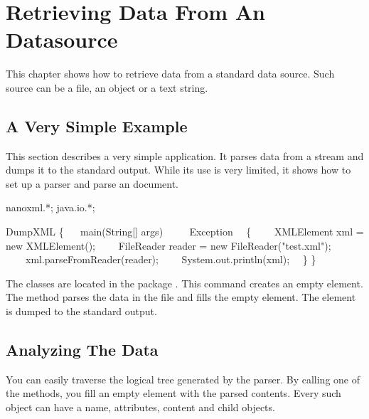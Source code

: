 \chapter{Retrieving Data From An  Datasource}

This chapter shows how to retrieve  data from a standard data source.
Such source can be a file, an  object or a text string.

\section{A Very Simple Example}

This section describes a very simple  application.
It parses  data from a stream and dumps it to the standard output.
While its use is very limited, it shows how to set up a parser and parse an
 document.

\begin{example}
 nanoxml.*;
 java.io.*;

 DumpXML
\{
~~ main(String[] args)
~~~~ Exception
~~\{
~~~~XMLElement xml = new XMLElement();
~~~~FileReader reader = new FileReader("test.xml");
~~~~xml.parseFromReader(reader);
~~~~System.out.println(xml);
~~\}
\}
\end{example}

\begin{callout}
  \coitem
    The  classes are located in the package .
  \coitem
    This command creates an empty  element.
  \coitem
    The method  parses the data in the file
     and fills the empty element.
  \coitem
    The  element is dumped to the standard output.
\end{callout}

\section{Analyzing The Data}

You can easily traverse the logical tree generated by the parser.
By calling one of the  methods, you fill an empty
 element with the parsed contents.
Every such object can have a name, attributes,  content and child
objects.

